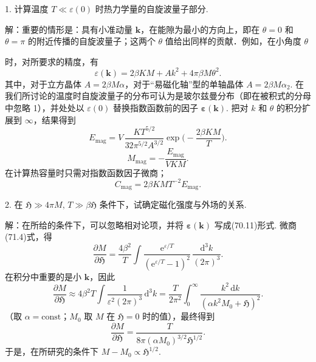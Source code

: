 \begin{xiti}

1. 计算温度 $T\ll\varepsilon(0)$ 时热力学量的自旋波量子部分.

{\heiti 解：}重要的情形是：具有小准动量 $\bm{k}$，在能隙为最小的方向上，即在 $\theta=0$ 和 $\theta=\pi$ 的附近传播的自旋波量子；这两个 $\theta$ 值给出同样的贡献．例如，在小角度 $\theta$

时，对所要求的精度，有
\begin{equation*}
\varepsilon(\bm{k})=2\beta KM+Ak^2+4\pi\beta M\theta^2.
\end{equation*}
其中，对于立方晶体 $A=2\beta M\alpha$，对于“易磁化轴”型的单轴晶体 $A=2\beta M\alpha_2$. 在我们所讨论的温度时自旋波量子的分布可认为是玻尔兹曼分布（即在被积式的分母中忽略 1），并处处以 $\varepsilon(0)$ 替换指数函数前的因子 $\bm{\varepsilon}(\bm{k})$. 把对 $k$ 和 $\theta$ 的积分扩展到 $\infty$，结果得到
\begin{equation*}
E_{\mathrm{mag}}=V\,\frac{KT^{5/2}}{32\pi^{5/2}A^{3/2}}
\exp\bigg(-\frac{2\beta KM}{T}\bigg).
\end{equation*}
\begin{equation*}
M_{\mathrm{mag}}=-\frac{E_{\mathrm{mag}}}{VKM}.
\end{equation*}
在计算热容量时只需对指数函数因子微商；
\begin{equation*}
C_{\mathrm{mag}}=2\beta KMT^{-2}E_{\mathrm{mag}}.
\end{equation*}

2. 在 $\mathfrak{H}\gg4\pi M,\,T\gg\beta\mathfrak{H}$ 条件下，试确定磁化强度与外场的关系.

{\heiti 解：}在所给的条件下，可以忽略相对论项，并将 $\bm{\varepsilon}(\bm{k})$ 写成(70.11)形式. 微商(71.4)式，得
\begin{equation*}
\frac{\partial M}{\partial\mathfrak{H}}=\frac{4\beta^2}{T}
\int\frac{\mathrm{e}^{\varepsilon/T}}{(\mathrm{e}^{\varepsilon/T}-1)^2}\,
\frac{\mathrm{d}^3k}{(2\pi)^3}.
\end{equation*}
在积分中重要的是小 $\bm{k}$，因此
\begin{equation*}
\frac{\partial M}{\partial\mathfrak{H}}\approx4\beta^2T\int\frac{1}{\varepsilon^2(2\pi)^3}\,\mathrm{d}^3k
=\frac{T}{2\pi^2}\int_0^{\infty}\frac{k^2\,\mathrm{d}k}{(\alpha k^2M_0+\mathfrak{H})^2}.
\end{equation*}
（取 $\alpha=\mathrm{const}$；$M_0$ 取 $M$ 在 $\mathfrak{H}=0$ 时的值），最终得到
\begin{equation*}
\frac{\partial M}{\partial\mathfrak{H}}=\frac{T}{8\pi(\alpha M_0)^{3/2}\mathfrak{H}^{1/2}}.
\end{equation*}
于是，在所研究的条件下 $M-M_0\propto\mathfrak{H}^{1/2}$.


\end{xiti}

